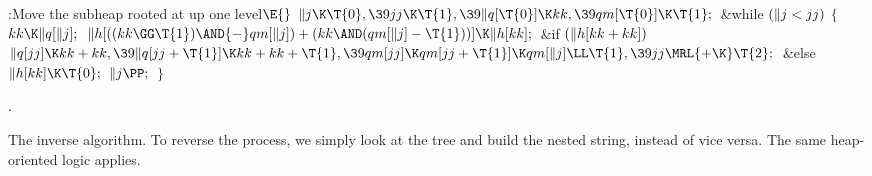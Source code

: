 \Y\B\4:Move the subheap rooted at  up one level\X${}\E{}$\6
$\|j\K\T{0},\39\\{jj}\K\T{1},\39\|q[\T{0}]\K\\{kk},\39\\{qm}[\T{0}]\K\T{1};{}$\6
\&{while} ${}(\|j<\\{jj}){}$\5
${}\{{}$\1\6
${}\\{kk}\K\|q[\|j];{}$\6
${}\|h[((\\{kk}\GG\T{1})\AND{-}\\{qm}[\|j])+(\\{kk}\AND(\\{qm}[\|j]-\T{1}))]\K%
\|h[\\{kk}];{}$\6
\&{if} ${}(\|h[\\{kk}+\\{kk}]){}$\1\5
${}\|q[\\{jj}]\K\\{kk}+\\{kk},\39\|q[\\{jj}+\T{1}]\K\\{kk}+\\{kk}+\T{1},\39%
\\{qm}[\\{jj}]\K\\{qm}[\\{jj}+\T{1}]\K\\{qm}[\|j]\LL\T{1},\39\\{jj}\MRL{+{\K}}%
\T{2};{}$\2\6
\&{else}\1\5
${}\|h[\\{kk}]\K\T{0};{}$\2\6
${}\|j\PP;{}$\6
\4${}\}{}$\2\par
{}.\fi

The inverse algorithm. To reverse the process, we simply look at the
tree and build the nested string, instead of vice versa. The same
heap-oriented logic applies.

